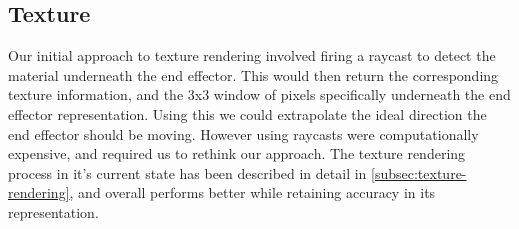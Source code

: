 \subsection{Texture}
Our initial approach to texture rendering involved firing a raycast to detect the material underneath the end effector. This would then return the corresponding texture information, and the 3x3 window of pixels specifically underneath the end effector representation. Using this we could extrapolate the ideal direction the end effector should be moving. However using raycasts were computationally expensive, and required us to rethink our approach. The texture rendering process in it's current state has been described in detail in \ref{subsec:texture-rendering}, and overall performs better while retaining accuracy in its representation.
